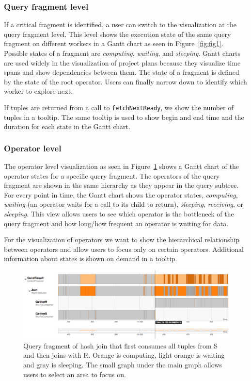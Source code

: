 \documentclass[11pt]{scrartcl}
\begin{document}
\subsubsection{Query fragment level}

If a critical fragment is identified, a user can switch to the visualization at the query fragment level. This level shows the execution state of the same query fragment on different workers in a Gantt chart as seen in Figure~\ref{fig:fig1}. Possible states of a fragment are \emph{computing}, \emph{waiting}, and \emph{sleeping}. Gantt charts are used widely in the visualization of project plans because they visualize time spans and show dependencies between them. The state of a fragment is defined by the state of the root operator. Users can finally narrow down to identify which worker to explore next.

If tuples are returned from a call to \texttt{fetchNextReady}, we show the number of tuples in a tooltip. The same tooltip is used to show begin and end time and the duration for each state in the Gantt chart.

\subsubsection{Operator level}

The operator level visualization as seen in Figure~\ref{fig:gantt} shows a Gantt chart of the operator states for a specific query fragment. The operators of the query fragment are shown in the same hierarchy as they appear in the query subtree. For every point in time, the Gantt chart shows the operator states, \emph{computing}, \emph{waiting} (an operator waits for a call to its child to return), \emph{sleeping}, \emph{receiving}, or \emph{sleeping}. This view allows users to see which operator is the bottleneck of the query fragment and how long/how frequent an operator is waiting for data.

For the visualization of operators we want to show the hierarchical relationship between operators and allow users to focus only on certain operators. Additional information about states is shown on demand in a tooltip.

\begin{figure}[h]
  \begin{center}
    \includegraphics[width=\textwidth]{join_gantt}
  \end{center}
  \caption{Query fragment of hash join that first consumes all tuples from S and then joins with R. Orange is computing, light orange is waiting and gray is sleeping. The small graph under the main graph allows users to select an area to focus on.}
  \label{fig:gantt}
\end{figure}
\end{document}
